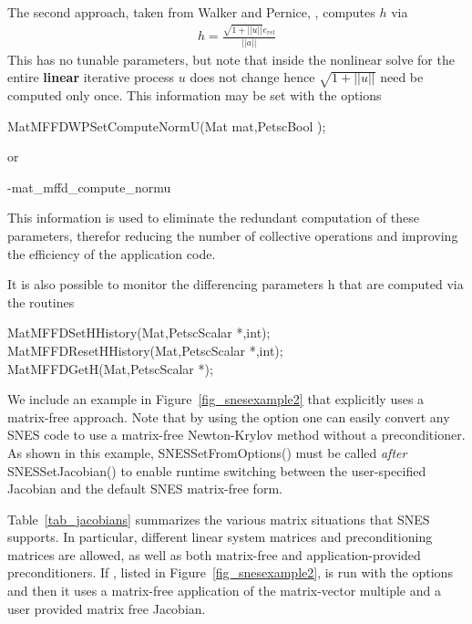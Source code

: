 The second approach, taken from Walker and Pernice, \cite{pw98}, computes $ h $ via
\begin{eqnarray*}
        h = \frac{\sqrt{1 + ||u||}e_{rel}}{||a||}
\end{eqnarray*}
This has no tunable parameters, but note that inside the nonlinear solve for
the entire {\bf linear} iterative process $ u $ does not change hence
$\sqrt{1 + ||u||} $ need be computed only once. This information may be set with the
options
\begin{tabbing}
  MatMFFDWPSetComputeNormU(Mat mat,PetscBool );
\end{tabbing}
or
\begin{tabbing}
   -mat\_mffd\_compute\_normu 
\end{tabbing}
This information is used to eliminate the redundant computation of these parameters,
therefor reducing the number of collective operations and improving the efficiency of the
application code.

It is also possible to monitor the differencing parameters h that are computed
via the routines
\begin{tabbing}
   MatMFFDSetHHistory(Mat,PetscScalar *,int);\\
   MatMFFDResetHHistory(Mat,PetscScalar *,int);\\
   MatMFFDGetH(Mat,PetscScalar *);\\
\end{tabbing}

We include an example in Figure~\ref{fig_snesexample2} that explicitly
uses a matrix-free approach.  Note that by using the option
 one can easily convert any SNES code to use a matrix-free
Newton-Krylov method without a preconditioner.  As shown in this
example, SNESSetFromOptions() must be called {\em after}
SNESSetJacobian() to enable runtime switching between the
user-specified Jacobian and the default SNES matrix-free form.

Table~\ref{tab_jacobians} summarizes the various matrix situations
that SNES supports.  In particular, different linear system matrices
and preconditioning matrices are allowed, as well as both matrix-free
and application-provided preconditioners.  If
,
 listed in Figure~\ref{fig_snesexample2}, is run with the options  and  then it uses a matrix-free application of the matrix-vector multiple and a user provided matrix free Jacobian.


